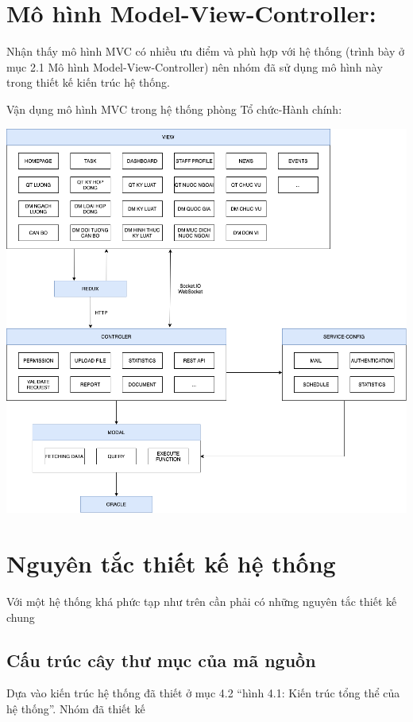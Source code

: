 \section{Mô hình Model-View-Controller:}
Nhận thấy mô hình MVC có nhiều ưu điểm và phù hợp với hệ thống (trình bày ở mục 2.1 Mô hình Model-View-Controller) nên nhóm đã sử dụng mô hình này trong thiết kế kiến trúc hệ thống.

Vận dụng mô hình MVC trong hệ thống phòng Tổ chức-Hành chính:
\begin{center}
  \captionsetup{type=figure}
  \includegraphics[width=15cm]{img/MVCInTchc.png}
\end{center}

\section{Nguyên tắc thiết kế hệ thống}
\indent Với một hệ thống khá phức tạp như trên cần phải có những nguyên tắc thiết kế chung
\subsection{Cấu trúc cây thư mục của mã nguồn}
\indent Dựa vào kiến trúc hệ thống đã thiết ở mục 4.2 ``hình 4.1: Kiến trúc tổng thể của hệ thống''. Nhóm đã thiết kế 

